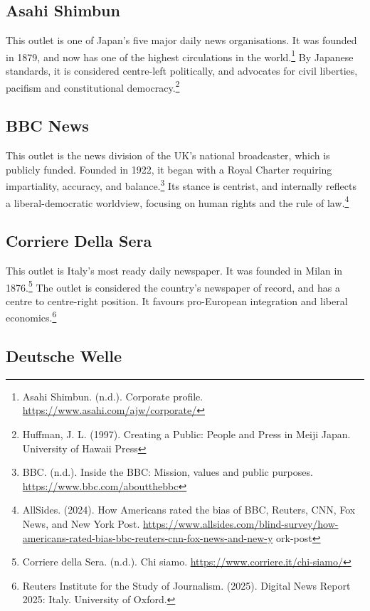 \subsection{Asahi Shimbun}

This outlet is one of Japan’s five major daily news organisations. It was founded in 1879, and now has one of the highest circulations in the world.\footnote{Asahi Shimbun. (n.d.). Corporate profile. \url{https://www.asahi.com/ajw/corporate/}} By Japanese standards, it is considered centre-left politically, and advocates for civil liberties, pacifism and constitutional democracy.\footnote{Huffman, J. L. (1997). Creating a Public: People and Press in Meiji Japan. University of Hawaii Press}

\subsection{BBC News}

This outlet is the news division of the UK’s national broadcaster, which is publicly funded. Founded in 1922, it began with a Royal Charter requiring impartiality, accuracy, and balance.\footnote{BBC. (n.d.). Inside the BBC: Mission, values and public purposes. \url{https://www.bbc.com/aboutthebbc}} Its stance is centrist, and internally reflects a liberal-democratic worldview, focusing on human rights and the rule of law.\footnote{AllSides. (2024). How Americans rated the bias of BBC, Reuters, CNN, Fox News, and New York Post. \url{https://www.allsides.com/blind-survey/how-americans-rated-bias-bbc-reuters-cnn-fox-news-and-new-y} ork-post}

\subsection{Corriere Della Sera}

This outlet is Italy’s most ready daily newspaper. It was founded in Milan in 1876.\footnote{Corriere della Sera. (n.d.). Chi siamo. \url{https://www.corriere.it/chi-siamo/}} The outlet is considered the country’s newspaper of record, and has a centre to centre-right position. It favours pro-European integration and liberal economics.\footnote{Reuters Institute for the Study of Journalism. (2025). Digital News Report 2025: Italy. University of Oxford.}

\subsection{Deutsche Welle}

